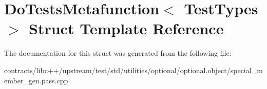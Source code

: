 \hypertarget{struct_do_tests_metafunction}{}\section{Do\+Tests\+Metafunction$<$ Test\+Types $>$ Struct Template Reference}
\label{struct_do_tests_metafunction}


The documentation for this struct was generated from the following file\+:\begin{DoxyCompactItemize}
\item 
contracts/libc++/upstream/test/std/utilities/optional/optional.\+object/special\+\_\+member\+\_\+gen.\+pass.\+cpp\end{DoxyCompactItemize}
